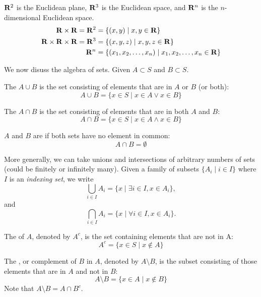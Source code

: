 \begin{example}
$\mathbf R^2$ is the Euclidean plane, $\mathbf R^3$ is the Euclidean space, and $\mathbf R^n$ is the $n$-dimensional Euclidean space.
\begin{align*}
\mathbf R \times \mathbf R = \mathbf R^2 &= \{(x,y) \mid x,y \in \mathbf R\} \\
\mathbf R \times \mathbf R \times \mathbf R = \mathbf R^3 &= \{(x,y,z) \mid x,y,z \in \mathbf R\} \\
\mathbf R^n &= \{(x_1,x_2,\dots,x_n) \mid x_1,x_2,\dots,x_n \in \mathbf R\}
\end{align*}
\end{example}

We now disuss the algebra of sets. Given $A \subset S$ and $B \subset S$.

The  $A \cup B$ is the set consisting of elements that are in $A$ or $B$ (or both):
\[ A\cup B=\{x \in S \mid x\in A \lor x\in B\} \]

The  $A \cap B$ is the set consisting of elements that are in both $A$ and $B$:
\[ A\cap B=\{x \in S \mid x\in A \land x\in B\} \]

$A$ and $B$ are  if both sets have no element in common:
\[ A\cap B = \emptyset \]

More generally, we can take unions and intersections of arbitrary numbers of sets (could be finitely or infinitely many). Given a family of subsets $\{A_i\mid i\in I\}$ where $I$ is an \emph{indexing set}, we write
\[\bigcup_{i\in I}A_i=\{x \mid \exists i\in I, x\in A_i\},\]
and
\[\bigcap_{i\in I}A_i=\{x \mid \forall i\in I, x\in A_i\}.\]

The  of $A$, denoted by $A^c$, is the set containing elements that are not in A:
\[ A^c = \{x \in S \mid x \notin A\} \]

The , or complement of $B$ in $A$, denoted by $A\setminus B$, is the subset consisting of those elements that are in $A$ and not in $B$:
\[ A\setminus B = \{x \in A \mid x \notin B\} \]
Note that $A\setminus B = A \cap B^c$.

